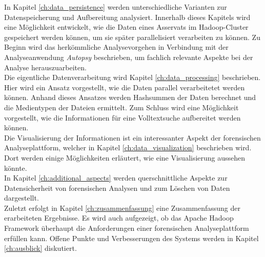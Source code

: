 \noindent
In Kapitel \ref{ch:data_persistence} werden unterschiedliche Varianten zur Datenspeicherung und Aufbereitung analysiert. Innerhalb dieses Kapitels wird eine Möglichkeit entwickelt, wie die Daten eines Asservats im Hadoop-Cluster gespeichert werden können, um sie später parallelisiert verarbeiten zu können. Zu Beginn wird das herkömmliche Analysevorgehen in Verbindung mit der Analyseanwendung \textit{Autopsy} beschrieben, um fachlich relevante Aspekte bei der Analyse herauszuarbeiten.\\

\noindent
Die eigentliche Datenverarbeitung wird Kapitel \ref{ch:data_processing} beschrieben. Hier wird ein Ansatz vorgestellt, wie die Daten parallel verarbeitetet werden können. Anhand dieses Ansatzes werden Hashsummen der Daten berechnet und die Medientypen der Dateien ermittelt. Zum Schluss wird eine Möglichkeit vorgestellt, wie die Informationen für eine Volltextsuche aufbereitet werden können.\\



\noindent
Die Visualisierung der Informationen ist ein interessanter Aspekt der forensischen Analyseplattform, welcher in Kapitel \ref{ch:data_visualization} beschrieben wird. Dort werden einige Möglichkeiten erläutert, wie eine Visualisierung aussehen könnte.\\

\noindent
In Kapitel \ref{ch:additional_aspects} werden querschnittliche Aspekte zur Datensicherheit von forensischen Analysen und zum Löschen von Daten dargestellt.\\

\noindent
Zuletzt erfolgt in Kapitel \ref{ch:zusammenfassung} eine Zusammenfassung der erarbeiteten Ergebnisse. Es wird auch aufgezeigt, ob das Apache Hadoop Framework überhaupt die Anforderungen einer forensischen Analyseplattform erfüllen kann. Offene Punkte und Verbesserungen des Systems werden in Kapitel \ref{ch:ausblick} diskutiert. 
